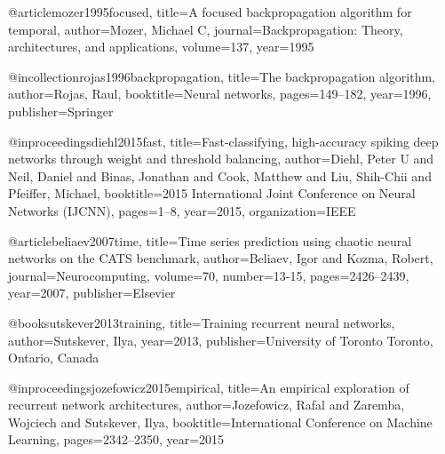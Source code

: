 @article{mozer1995focused,
  title={A focused backpropagation algorithm for temporal},
  author={Mozer, Michael C},
  journal={Backpropagation: Theory, architectures, and applications},
  volume={137},
  year={1995}
}

@incollection{rojas1996backpropagation,
  title={The backpropagation algorithm},
  author={Rojas, Raul},
  booktitle={Neural networks},
  pages={149--182},
  year={1996},
  publisher={Springer}
}

@inproceedings{diehl2015fast,
  title={Fast-classifying, high-accuracy spiking deep networks through weight and threshold balancing},
  author={Diehl, Peter U and Neil, Daniel and Binas, Jonathan and Cook, Matthew and Liu, Shih-Chii and Pfeiffer, Michael},
  booktitle={2015 International Joint Conference on Neural Networks (IJCNN)},
  pages={1--8},
  year={2015},
  organization={IEEE}
}

@article{beliaev2007time,
  title={Time series prediction using chaotic neural networks on the CATS benchmark},
  author={Beliaev, Igor and Kozma, Robert},
  journal={Neurocomputing},
  volume={70},
  number={13-15},
  pages={2426--2439},
  year={2007},
  publisher={Elsevier}
}


@book{sutskever2013training,
  title={Training recurrent neural networks},
  author={Sutskever, Ilya},
  year={2013},
  publisher={University of Toronto Toronto, Ontario, Canada}
}

@inproceedings{jozefowicz2015empirical,
  title={An empirical exploration of recurrent network architectures},
  author={Jozefowicz, Rafal and Zaremba, Wojciech and Sutskever, Ilya},
  booktitle={International Conference on Machine Learning},
  pages={2342--2350},
  year={2015}
}